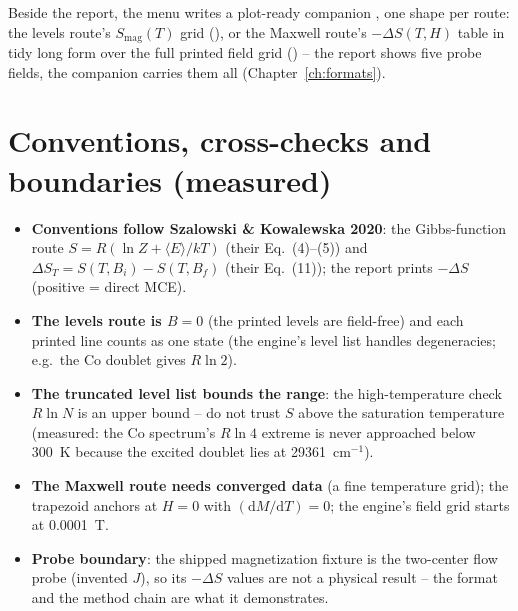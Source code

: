 Beside the report, the menu writes a plot-ready companion
, one shape per route: the levels route's
$S_{\mathrm{mag}}(T)$ grid
(), or the Maxwell route's
$-\Delta S(T, H)$ table in tidy long form over the full printed field grid
() -- the
report shows five probe fields, the companion carries them all
(Chapter~\ref{ch:formats}).

\section{Conventions, cross-checks and boundaries (measured)}

\begin{readbox}
\begin{itemize}
  \item \textbf{Conventions follow Szalowski \& Kowalewska 2020}: the
    Gibbs-function route $S = R(\ln Z + \langle E\rangle/kT)$ (their
    Eq.~(4)--(5)) and $\Delta S_T = S(T, B_i) - S(T, B_f)$ (their
    Eq.~(11)); the report prints $-\Delta S$ (positive = direct MCE).
  \item \textbf{The levels route is $B = 0$} (the printed levels are
    field-free) and each printed line counts as one state (the engine's
    level list handles degeneracies; e.g.\ the Co doublet gives
    $R\ln 2$).
  \item \textbf{The truncated level list bounds the range}: the
    high-temperature check $R\ln N$ is an upper bound -- do not trust $S$
    above the saturation temperature (measured: the Co spectrum's
    $R\ln 4$ extreme is never approached below 300~K because the excited
    doublet lies at 29361~cm$^{-1}$).
  \item \textbf{The Maxwell route needs converged data} (a fine
    temperature grid); the trapezoid anchors at $H = 0$ with
    $(\mathrm{d}M/\mathrm{d}T) = 0$; the engine's field grid starts at
    0.0001~T.
  \item \textbf{Probe boundary}: the shipped magnetization fixture is the
    two-center flow probe (invented $J$), so its $-\Delta S$ values are
    not a physical result -- the format and the method chain are what it
    demonstrates.
\end{itemize}
\end{readbox}
